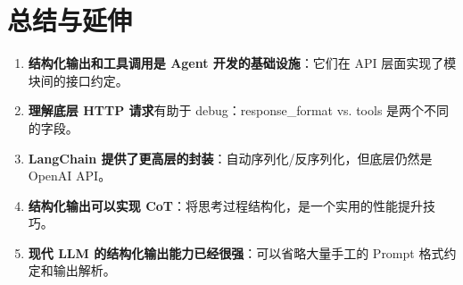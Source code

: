 \section{总结与延伸}

\begin{enumerate}
    \item \textbf{结构化输出和工具调用是 Agent 开发的基础设施}：它们在 API 层面实现了模块间的接口约定。
    \item \textbf{理解底层 HTTP 请求}有助于 debug：response\_format vs. tools 是两个不同的字段。
    \item \textbf{LangChain 提供了更高层的封装}：自动序列化/反序列化，但底层仍然是 OpenAI API。
    \item \textbf{结构化输出可以实现 CoT}：将思考过程结构化，是一个实用的性能提升技巧。
    \item \textbf{现代 LLM 的结构化输出能力已经很强}：可以省略大量手工的 Prompt 格式约定和输出解析。
\end{enumerate}


